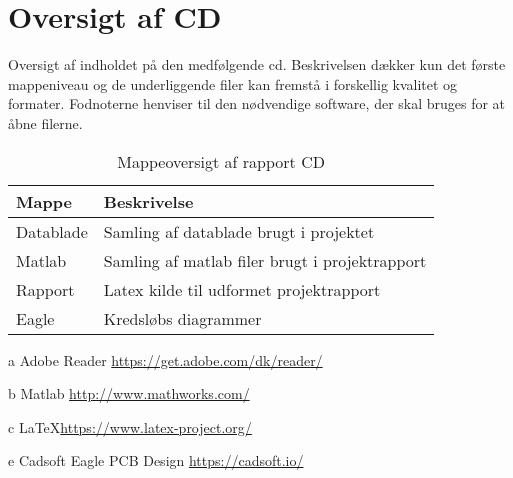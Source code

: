 \newpage
\section{Oversigt af CD}\label{bilag:cd}
Oversigt af indholdet på den medfølgende cd. Beskrivelsen dækker kun det første mappeniveau og de underliggende filer kan fremstå i forskellig kvalitet og formater. Fodnoterne henviser til den nødvendige software, der skal bruges for at åbne filerne.

\begin{table}[h!]
\centering
\caption{Mappeoversigt af rapport CD}
\label{tab:ordliste}
\begin{threeparttable}
\begin{tabular}{l l}
\toprule
\multicolumn{1}{l}{Mappe}       &
\multicolumn{1}{l}{Beskrivelse}  \\ 
\midrule
Datablade					& Samling af datablade brugt i projektet \tnote{a}\\
Matlab						& Samling af matlab filer brugt i projektrapport\tnote{b} \\
Rapport						& Latex kilde til udformet projektrapport\tnote{c} \\
Eagle						& Kredsløbs diagrammer\tnote{e} \\
\bottomrule
\end{tabular}
\begin{tablenotes}
\item[a] Adobe Reader  \url{https://get.adobe.com/dk/reader/}
\item[b] Matlab \url{http://www.mathworks.com/}
\item[c] \LaTeX \url{https://www.latex-project.org/}
\item[e] Cadsoft Eagle PCB Design \url{https://cadsoft.io/}
\end{tablenotes}
\end{threeparttable}
\end{table}
\label{LastPage}
